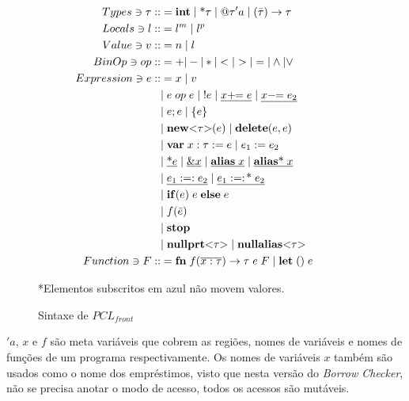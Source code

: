 \def\notmov#1{\color{blue}\underline{{\color{black}#1}}\color{black}}

\begin{figure}[ht]
	\caption{Sintaxe de $PCL_{front}$}
	\label{fig:pcl-front:sintax}
	\begin{align*}
		Types \ni \tau ::&= \KW{int} \OR \text{*}\tau \OR @\tau'a \OR (\bar\tau) \to \tau \\
		Locals \ni l ::&= l^m \OR l^p &&\\ 
		Value \ni v ::&= n \OR l && \\
		BinOp \ni op ::&= + | - | * | < | > | = | \land | \lor \\
		Expression \ni e ::&= x \OR v \\
		&\NLOR e\; op\; e \OR !e \OR \notmov{x +\!\!= e} \OR \notmov{x -\!\!= e_2}\\
		&\NLOR e;e \OR \{e\} \\ 
		&\NLOR \KW{new}\typearg\tau(e) \OR \KW{delete}(e, e) \; \\ 
		&\NLOR \KW{var}\; x: \tau := e \OR e_1 := e_2 \\
		&\NLOR \notmov{\text{*}e} \OR \notmov{\&x} \OR \notmov{\KW{alias} \; x} \OR \notmov{\KW{alias}\text{*} \; x}\\
		&\NLOR \notmov{e_1 :=: e_2} \OR \notmov{e_1 :=:\!\text{*}\;e_2}\\
		&\NLOR \KW{if}(e) \; e \; \KW{else} \; e\\
		&\NLOR f(\bar e) \\ 
		&\NLOR \KW{stop}\\ 
		&\NLOR \KW{nullprt}\typearg{\tau} \OR \KW{nullalias}\typearg{\tau}\\ 
		Function \ni F ::&= \KW{fn} \; f(\overline{x : \tau}) \to \tau \; e \; F \; | \; \mathbf{let}\;() \; e \\
	\end{align*}
	\vspace{-4em}
	\begin{flushleft}
		\small
		{\color{red}*}Elementos subscritos em {\color{blue} azul} não movem valores.
	\end{flushleft}
\end{figure}

\noindent$'a$, $x$ e $f$ são meta variáveis que cobrem as regiões, nomes de variáveis e nomes de funções de um programa respectivamente. Os nomes de variáveis $x$ também são usados como o nome dos empréstimos, visto que nesta versão do \emph{Borrow Checker}, não se precisa anotar o modo de acesso, todos os acessos são mutáveis.
 
